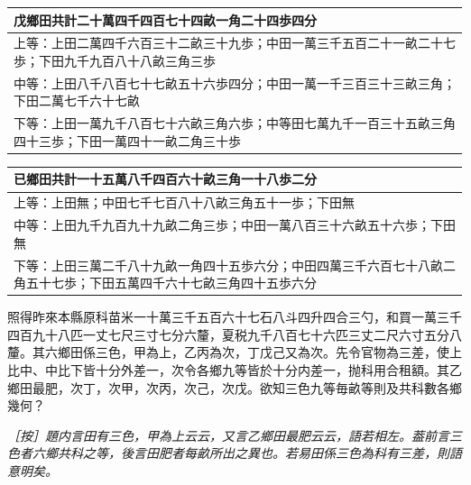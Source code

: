 \documentclass[11pt,a4paper]{article}
\newcommand{\EditorialNote}[1]{\par\noindent\textit{［按］#1}\par}
\begin{document}
{\begin{longtable}{p{}}
\toprule
\textbf{戊鄉}田共計二十萬四千四百七十四畝一角二十四歩四分\\
\midrule
\endhead
上等：上田二萬四千六百三十二畝三十九歩；中田一萬三千五百二十一畝二十七歩；下田九千九百八十八畝三角三歩\\
中等：上田八千八百七十七畝五十六歩四分；中田一萬一千三百三十三畝三角；下田二萬七千六十七畝\\
下等：上田一萬九千八百七十六畝三角六歩；中等田七萬九千一百三十五畝三角四十三歩；下田一萬四十一畝二角三十歩\\
\bottomrule
\end{longtable}

\begin{longtable}{p{}}
\toprule
\textbf{已鄉}田共計一十五萬八千四百六十畝三角一十八歩二分\\
\midrule
\endhead
上等：上田無；中田七千七百八十八畝三角五十一歩；下田無\\
中等：上田九千九百九十九畝二角三歩；中田一萬八百三十六畝五十六歩；下田無\\
下等：上田三萬二千八十九畝一角四十五歩六分；中田四萬三千六百七十八畝二角五十七歩；下田五萬四千六十七畝三角四十五歩六分\\
\bottomrule
\end{longtable}

照得昨來本縣原科苗米一十萬三千五百六十七石八斗四升四合三勺，和買一萬三千四百九十八匹一丈七尺三寸七分六釐，夏税九千八百七十六匹三丈二尺六寸五分八釐。其六鄉田係三色，甲為上，乙丙為次，丁戊己又為次。先令官物為三差，使上比中、中比下皆十分外差一，次令各鄉九等皆於十分内差一，抛科用合租額。其乙鄉田最肥，次丁，次甲，次丙，次己，次戊。欲知三色九等毎畝等則及共科數各鄉幾何？
}

\EditorialNote{題内言田有三色，甲為上云云，又言乙鄉田最肥云云，語若相左。葢前言三色者六鄉共科之等，後言田肥者每畝所出之異也。若易田係三色為科有三差，則語意明矣。}
\end{document}

